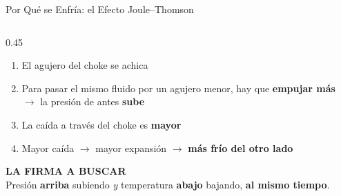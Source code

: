 \documentclass[aspectratio=169, 11pt]{beamer}
\begin{document}
\begin{frame}[shrink=16]{Por Qué se Enfría: el Efecto Joule--Thomson}
\begin{columns}[T]
\begin{column}{0.45\textwidth}
{      \begin{enumerate}\setlength{\itemsep}{4pt}
        \item El agujero del choke se achica
        \item Para pasar el mismo fluido por un agujero menor, hay que
              \textbf{empujar más} $\rightarrow$ la presión de antes
              \textbf{sube}
        \item La caída a través del choke es \textbf{mayor}
        \item Mayor caída $\rightarrow$ mayor expansión $\rightarrow$
              \textbf{más frío del otro lado}
      \end{enumerate}}
      \vspace{6pt}
      \begin{tcolorbox}[colback=arcaGray, colframe=arcaRed, boxrule=0pt, leftrule=3pt,
        arc=3pt, left=6pt, right=6pt, top=4pt, bottom=4pt]
        {\scriptsize\color{arcaRed}\bfseries\faKey\hspace{4pt}LA FIRMA A BUSCAR}\\[3pt]
        {\scriptsize\color{textMuted}
         Presión \textbf{arriba} subiendo \emph{y} temperatura
         \textbf{abajo} bajando, \textbf{al mismo tiempo}.}
      \end{tcolorbox}
    \end{column}
  \end{columns}
\end{frame}
\end{document}
